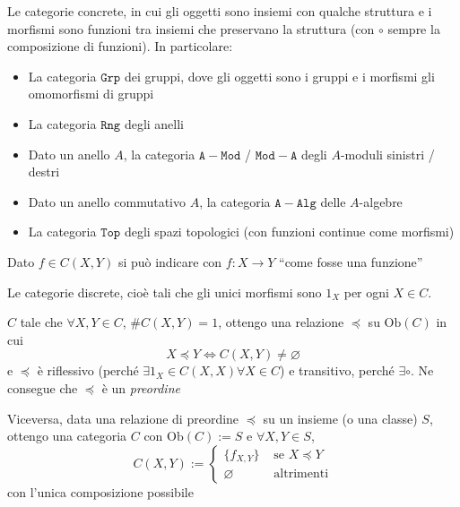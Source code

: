 \begin{example}{}
    Le categorie concrete, in cui gli oggetti sono insiemi con qualche struttura
    e i morfismi sono funzioni tra insiemi che preservano la struttura (con \(\circ\) sempre la composizione di funzioni). In particolare:
\begin{itemize}
    \item La categoria \(\mathtt{Grp}\) dei gruppi, dove gli oggetti sono i
        gruppi e i morfismi gli omomorfismi di gruppi
    \item La categoria \(\mathtt{Rng}\) degli anelli
    \item Dato un anello \(A\), la categoria \(\mathtt{A-Mod}\) / \(\mathtt{Mod-A}\) degli \(A\)-moduli sinistri / destri
    \item Dato un anello commutativo \(A\), la categoria \(\mathtt{A-Alg}\)
        delle \(A\)-algebre
    \item La categoria \(\mathtt{Top}\) degli spazi topologici (con funzioni
        continue come morfismi)
\end{itemize}
\end{example}
\begin{note}{}
    Dato \(f \in C{(X, Y)}\) si può indicare con \(f : X \to Y\) ``come fosse
    una funzione''
\end{note}

\begin{example}{}
    Le categorie discrete, cioè tali che gli unici morfismi sono \(1_X\) per
    ogni \(X \in C\).
\end{example}

\begin{example}{}
    \(C\) tale che \(\forall X, Y \in C\), \(\# C {(X, Y)} = 1\), ottengo
    una relazione \(\preccurlyeq \) su \(\mathrm{Ob}{(C)}\) in cui
    \[
      X \preccurlyeq Y \iff C{(X, Y)} \neq \varnothing
    \]
    e \(\preccurlyeq\)  è riflessivo (perché \(\exists  1_X \in C{(X, X)} \forall X \in C\)) e transitivo, perché \(\exists \circ\). Ne consegue che \(\preccurlyeq\) è un \emph{preordine}

    Viceversa, data una relazione di preordine \(\preccurlyeq\) su un insieme (o
    una classe) \(S\), ottengo una categoria \(C\) con \(\mathrm{Ob}{(C)} := S\) e \(\forall X, Y \in S\), 
    \[
      C{(X, Y)} := \begin{cases}{}
          \{f_{X,Y} \} & \text{ se } X \preccurlyeq Y \\
          \varnothing & \text{ altrimenti}
      \end{cases}
    \]
    con l'unica composizione possibile
\end{example}

